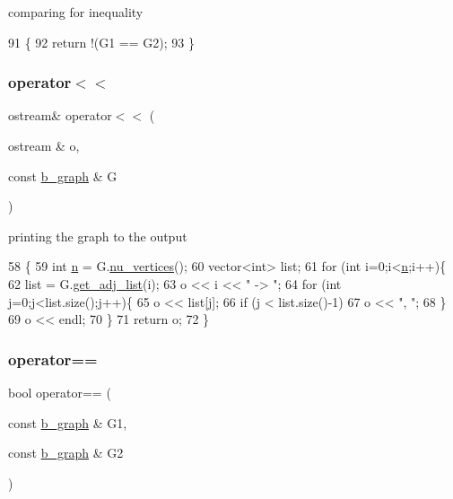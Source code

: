 comparing for inequality 


\begin{DoxyCode}
91 \{
92   \textcolor{keywordflow}{return} !(G1 == G2);
93 \}
\end{DoxyCode}
\mbox{\label{classb__graph_a0635d59bf5b2d1df3d3dd2beef14ac6e}} 
\subsubsection{\texorpdfstring{operator$<$$<$}{operator<<}}
{\footnotesize\ttfamily ostream\& operator$<$$<$ (\begin{DoxyParamCaption}\item[{ostream \&}]{o,  }\item[{const \hyperlink{classb__graph}{b\+\_\+graph} \&}]{G }\end{DoxyParamCaption})\hspace{0.3cm}{\ttfamily [friend]}}



printing the graph to the output 


\begin{DoxyCode}
58 \{
59   \textcolor{keywordtype}{int} \hyperlink{classb__graph_a9e211d40c1799bc9b125de472ff06642}{n} = G.\hyperlink{classb__graph_a69ff77c254af827afbfe52934b6736a5}{nu\_vertices}();
60   vector<int> list;
61   \textcolor{keywordflow}{for} (\textcolor{keywordtype}{int} i=0;i<\hyperlink{classb__graph_a9e211d40c1799bc9b125de472ff06642}{n};i++)\{
62     list = G.\hyperlink{classb__graph_aa81c7179b9c6cb4986c4b41e84a85799}{get\_adj\_list}(i);
63     o << i << \textcolor{stringliteral}{" -> "};
64     \textcolor{keywordflow}{for} (\textcolor{keywordtype}{int} j=0;j<list.size();j++)\{
65       o << list[j];
66       \textcolor{keywordflow}{if} (j < list.size()-1)
67         o << \textcolor{stringliteral}{", "};
68     \}
69     o << endl;
70   \}
71   \textcolor{keywordflow}{return} o;
72 \}
\end{DoxyCode}
\mbox{\label{classb__graph_adf87735e8372a81049b347b1fdd23484}} 
\subsubsection{\texorpdfstring{operator==}{operator==}}
{\footnotesize\ttfamily bool operator== (\begin{DoxyParamCaption}\item[{const \hyperlink{classb__graph}{b\+\_\+graph} \&}]{G1,  }\item[{const \hyperlink{classb__graph}{b\+\_\+graph} \&}]{G2 }\end{DoxyParamCaption})\hspace{0.3cm}{\ttfamily [friend]}}



